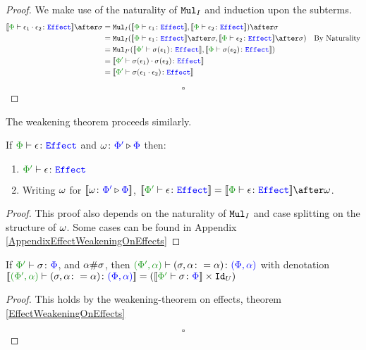 \documentclass{Report}
\begin{document}
\begin{framed}
\begin{proof}
    
    \case{\ecompose}
    
    We make use of the naturality of $\texttt{Mul}_I$ and induction upon the subterms.
    \begin{align*}
        \deno{\typerelation{\P}{\e_1\dot\e_2}{\effect}} \after\si &=
        \Mul_I(\deno{\typerelation{\P}{\e_1}{\effect}}, \deno{\typerelation{\P}{\e_2}{\effect}})\after \si \\
        & = \Mul_I(\deno{\typerelation{\P}{\e_1}{\effect}}\after \si, \deno{\typerelation{\P}{\e_2}{\effect}}\after \si)\qt{By Naturality}\\
        & = \Mul_{I'}(\deno{\typerelation{\P'}{\si(\e_1)}{\effect}}, \deno{\typerelation{\P}{\si(\e_2)}{\effect}})\\
        & = \deno{\typerelation{\P'}{\si(\e_1)\dot\si(\e_2)}{\effect}}\\
        & = \deno{\typerelation{\P'}{\si(\e_1\dot\e_2)}{\effect}}\\
    \end{align*}
    
    $$\square$$
    \end{proof}
\end{framed}

The weakening theorem proceeds similarly.

\begin{framed}
    \begin{theorem}\label{EffectWeakeningOnEffects}
       If $\wellformedeffect{\P}{\e}$ and $\omega \colon {\color{blue}\Phi'} \triangleright {\color {blue} \Phi}$ then: 
       \begin{enumerate}[label=\roman*.]
           \item $\wellformedeffect{\P'}{\e}$
           \item Writing $\omega$ for ${\bf [\![}\omega \colon {\color{blue}\Phi'} \triangleright {\color {blue} \Phi}{\bf ]\!]}$,  $\deno{\wellformedeffect{\P'}{\e}} = \deno{\wellformedeffect{\P}{\e}}\after\w$.
       \end{enumerate}    
    \end{theorem}
    
    \begin{proof}
        This proof also depends on the naturality of $\texttt{Mul}_I$ and case splitting on the structure of $\omega$.  Some cases can be found in Appendix \ref{AppendixEffectWeakeningOnEffects}
    \end{proof}
\end{framed}


\begin{framed}
    \begin{lemma}\label{ExtensionLemmaOnEffectSubstitutions}
        If $\typerelation{\P'}{\si}{\P}$, and $\alpha\#\sigma$, then $\typerelation{(\P', \a)}{(\si, \a\setto\a)}{(\P,\a)}$ with denotation $\deno{\typerelation{(\P', \a)}{(\si, \a\setto\a)}{(\P,\a)}} = (\deno{\typerelation{\P'}{\si}{\P}}\times\Id{U})$
    \end{lemma}
    \begin{proof}
       This holds by the weakening-theorem on effects, theorem \ref{EffectWeakeningOnEffects}
    
       $$\square$$
    \end{proof}
\end{framed}
\end{document}
